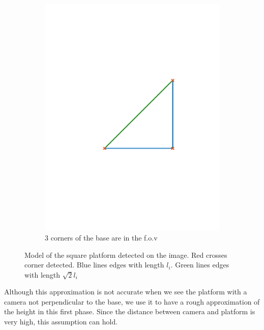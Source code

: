 \begin{figure}[!htbp]
\begin{subfigure}[b]{0.3\textwidth}
        \includegraphics[width=\textwidth]{img/platform_3_edges.pdf}
        \caption{3 corners of the base are in the f.o.v}
        \label{fig:3_corners}
   \end{subfigure}
   
   \caption{Model of the square platform detected on the image. Red crosses corner detected. Blue lines edges with length $l_i$. Green lines edges with length $\sqrt{2}l_i$ }
  \label{fig:platform_profile}
\end{figure} 

Although this approximation is not accurate when we see the platform with a camera not perpendicular to the base, we use it to have a rough approximation of the height in this first phase. Since the distance between camera and platform is very high, this assumption can hold.\\

